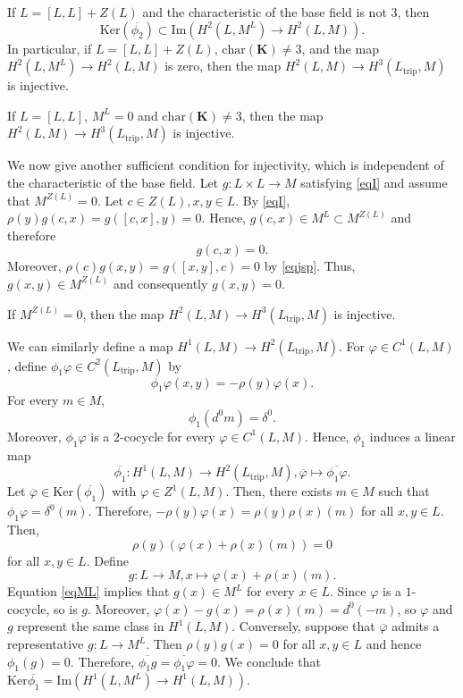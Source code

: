 \documentclass[11pt, twoside]{article}
\begin{document}
\begin{prop}\label{propinj1}
    If $L=[L,L]+Z(L) $ and the characteristic of the base field is not $3$, then $$\mathrm{Ker}(\overline{\phi_2})\subset \mathrm{Im}(H^2(L,M^L)\to H^2(L,M)). $$ In particular, if $L=[L,L]+Z(L) $, $\mathrm{char}(\mathbf{K})\neq 3$, and the map $H^2(L,M^L)\to H^2(L,M) $ is zero, then the map $H^2(L,M)\to H^3(L_\mathrm{trip},M)$ is injective.
\end{prop}

\begin{cor}
    If $L=[L,L] $, $M^L=0$ and $\mathrm{char}(\mathbf{K})\neq 3 $, then the map $H^2(L,M)\to H^3(L_\mathrm{trip},M)$ is injective.
\end{cor}

We now give another sufficient condition for injectivity, which is independent of the characteristic of the base field. Let $g:L\times L\to M$ satisfying \eqref{eqI} and assume that $M^{Z(L)}=0 $. Let $c\in Z(L),x,y\in L $. By \eqref{eqI}, $\rho(y)g(c,x)=g([c,x],y)=0 $. Hence, $g(c,x)\in M^L\subset M^{Z(L)}$ and therefore \begin{equation}\label{eqjsp}
    g(c,x)=0.
\end{equation} Moreover, $\rho(c)g(x,y)=g([x,y],c)=0 $ by \eqref{eqjsp}. Thus, $g(x,y)\in M^{Z(L)} $ and consequently $g(x,y)=0 $. 

\begin{prop}
    If $M^{Z(L)}=0 $, then the map $H^2(L,M)\to H^3(L_\mathrm{trip},M) $ is injective.
\end{prop}

We can similarly define a map $H^1(L,M)\to H^2(L_\mathrm{trip},M)$. For $\varphi\in C^1(L,M)$, define $\phi_1\varphi\in C^2(L_\mathrm{trip},M)$ by $$\phi_1\varphi(x,y)=-\rho(y)\varphi(x). $$ For every $m\in M$, $$\phi_1(d^0m)=\delta^0. $$ Moreover, $\phi_1\varphi$ is a $2$-cocycle for every $\varphi\in C^1(L,M)$. Hence, $\phi_1$ induces a linear map $$\overline{\phi_1}:H^1(L,M)\to H^2(L_\mathrm{trip},M), \overline{\varphi}\mapsto \overline{\phi_1\varphi}.  $$ Let $\overline{\varphi}\in \mathrm{Ker}(\overline{\phi_1})$ with $\varphi\in Z^1(L,M)$. Then, there exists $m\in M$ such that $\phi_1\varphi=\delta^0(m)$. Therefore, $-\rho(y)\varphi(x)=\rho(y)\rho(x)(m) $ for all $x,y\in L$. Then, \begin{equation}\label{eqML}
    \rho(y)(\varphi(x)+\rho(x)(m))=0
\end{equation} for all $x,y\in L$. Define $$g:L\to M, x\mapsto \varphi(x)+\rho(x)(m).$$ Equation \eqref{eqML} implies that $g(x)\in M^L$ for every $x\in L$. Since $\varphi$ is a $1$-cocycle, so is $g$. Moreover, $\varphi(x)-g(x)=\rho(x)(m)=d^0(-m)$, so $\varphi$ and $g$ represent the same class in $H^1(L,M)$. Conversely, suppose that $\overline{\varphi}$ admits a representative $g:L\to M^L$. Then $\rho(y)g(x)=0 $ for all $x,y\in L$ and hence $\phi_1(g)=0$. Therefore, $\overline{\phi_1g}=\overline{\phi_1\varphi}=0 $. We conclude that $\mathrm{Ker}\overline{\phi_1}= \mathrm{Im}(H^1(L,M^L)\to H^1(L,M))$. 
\end{document}

